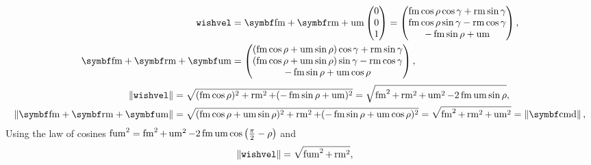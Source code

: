 \begin{align*}
\texttt{wishvel} &= \vec{\fmove} + \vec{\rmove} + \umove
\begin{pmatrix}
0\\0\\1
\end{pmatrix} =
\begin{pmatrix}
\fmove \cos\rho\cos\gamma + \rmove \sin\gamma\\
\fmove \cos\rho\sin\gamma - \rmove \cos\gamma\\
-\fmove \sin\rho + \umove
\end{pmatrix},\\
\vec{\fmove} + \vec{\rmove} + \vec{\umove} &=
\begin{pmatrix}
(\fmove \cos\rho + \umove \sin\rho)\cos\gamma + \rmove \sin\gamma\\
(\fmove \cos\rho + \umove \sin\rho)\sin\gamma - \rmove \cos\gamma\\
-\fmove \sin\rho + \umove \cos\rho
\end{pmatrix},
\end{align*}
\begin{align*}
\norm{\texttt{wishvel}} &= \sqrt{(\fmove \cos\rho)^2 + \rmove^2 + (-\fmove \sin\rho + \umove)^2} = \sqrt{\fmove^2 + \rmove^2 + \umove^2  - 2\fmove\umove\sin\rho},\\
\norm{\vec{\fmove} + \vec{\rmove} + \vec{\umove}} &= \sqrt{(\fmove \cos\rho + \umove \sin\rho)^2 + \rmove^2 + (-\fmove \sin\rho + \umove \cos\rho)^2} = \sqrt{\fmove^2 + \rmove^2 + \umove^2} = \norm{\vec{\cmd}},
\end{align*}
Using the law of cosines $\operatorname{fum}^2 = \operatorname{fm}^2 + \operatorname{um}^2 - 2\operatorname{fm}\operatorname{um}\cos\left(\frac{\pi}{2} - \rho \right)$ and
\begin{align*}
\left\lVert\texttt{wishvel}\right\rVert &= \sqrt{\operatorname{fum}^2 + \operatorname{rm}^2},
\end{align*}

